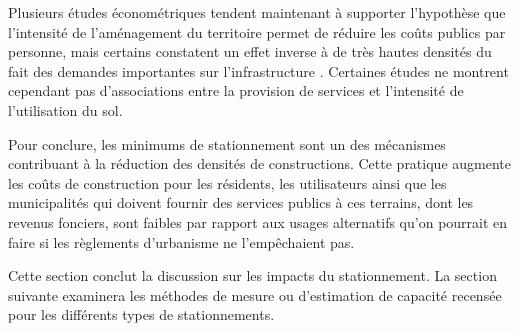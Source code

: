        Plusieurs études économétriques tendent maintenant à supporter l'hypothèse que l'intensité de l'aménagement du territoire permet de réduire les coûts publics par personne, \parencite{hortas-rico_does_2010,raghav_literature_2019} mais certains constatent un effet inverse à de très hautes densités du fait des demandes importantes sur l'infrastructure \parencite{goodman_fiscal_2019,ladd_population_1992,garrido-jimenez_municipal_2018}. Certaines études ne montrent cependant pas d'associations entre la provision de services et l'intensité de l'utilisation du sol. \parencite{holcombe_impact_2008,}\par

        
        Pour conclure, les minimums de stationnement sont un des mécanismes contribuant à la réduction des densités de constructions\parencite{smith_low-rise_1964}. Cette pratique augmente les coûts de construction pour les résidents, les utilisateurs ainsi que les municipalités qui doivent fournir des services publics à ces terrains, dont les revenus fonciers, sont faibles par rapport aux usages alternatifs qu'on pourrait en faire si les règlements d'urbanisme ne l'empêchaient pas.\par
        
        Cette section conclut la discussion sur les impacts du stationnement.  La section suivante examinera les méthodes de mesure ou d'estimation de capacité recensée pour les différents types de stationnements.
    